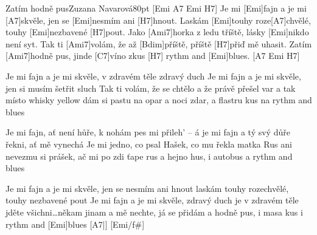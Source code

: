 \begin{song}{Zatím hodně pus}{Zuzana Navarová}{80pt}
[Emi A7 Emi H7]{}
%
Je mi [Emi]fajn a je mi [A7]skvěle, jen se [Emi]nesmím ani [H7]hnout.
Laskám [Emi]touhy roze[A7]chvělé, touhy [Emi]nezbavené [H7]pout.
Jako [Ami7]horka z ledu tříště, lásky [Emi]nikdo není syt.
Tak ti [Ami7]volám, že až [Bdim]příště, příště [H7]přiď mě uhasit.
Zatím [Ami7]hodně pus, jinde [C7]víno zkus [H7]{}
rythm and [Emi]blues. [A7 Emi H7]{}

%
Je mi fajn a je mi skvěle, v zdravém těle zdravý duch
Je mi fajn a je mi skvěle, jen si musím šetřit sluch
Tak ti volám, že se chtělo a že právě přešel var
a tak místo whisky yellow dám si pastu na opar
a noci zdar, a flastru kus
na rythm and blues

%
Je mi fajn, ať není hůře, k nohám pes mi přileh' -- á
je mi fajn a tý svý důře řekni, ať mě vynechá
Je mi jedno, co psal Hašek, co mu řekla matka Rus
ani nevezmu si prášek, ač mi po zdi ťape rus
a hejno hus, i autobus
a rythm and blues

%
Je mi fajn a je mi skvěle, jen se nesmím ani hnout
laskám touhy rozechvělé, touhy nezbavené pout
Je mi fajn a je mi skvěle, zdravý duch je v zdravém těle
jděte všichni\dots někam jinam a mě nechte, já se přidám
a hodně pus, i masa kus
\rl i rythm and [Emi]blues [A7|]{} [Emi/f#]{}

\end{song}
\vfil
\hfil{}
